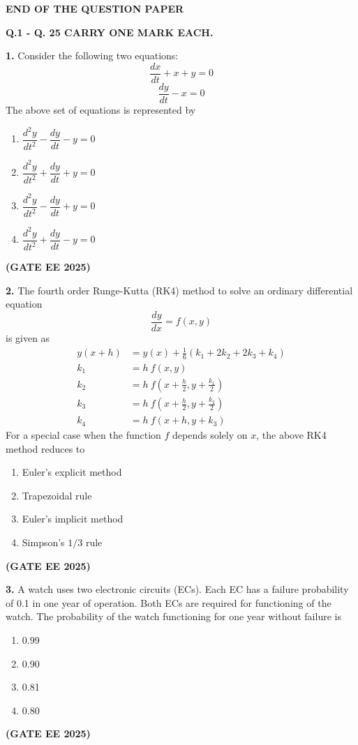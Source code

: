 \documentclass[journal,12pt,onecolumn]{IEEEtran}
\newcommand{\brak}[1]{(#1)}
\begin{document}
\begin{center}
\textbf{END OF THE QUESTION PAPER}
\end{center}
\newpage
\rmfamily 


\noindent\textbf{Q.1 - Q. 25 CARRY ONE MARK EACH.}


\noindent\textbf{1.} Consider the following two equations:
\[ \frac{dx}{dt}+x+y=0 \]
\[ \frac{dy}{dt}-x=0 \]
\normalsize The above set of equations is represented by
\begin{enumerate}
    \item $\dfrac{d^{2}y}{dt^{2}}-\dfrac{dy}{dt}-y=0$
    \item $\dfrac{d^{2}y}{dt^{2}}+\dfrac{dy}{dt}+y=0$
    \item $\dfrac{d^{2}y}{dt^{2}}-\dfrac{dy}{dt}+y=0$
    \item $\dfrac{d^{2}y}{dt^{2}}+\dfrac{dy}{dt}-y=0$
\end{enumerate}
\hfill \textbf{\brak{GATE EE 2025}}

\noindent\textbf{2.} The fourth order Runge-Kutta \brak{RK4} method to solve an ordinary differential equation
\[ \frac{dy}{dx}=f\brak{x,y} \]
is given as
\begin{align*}
y\brak{x+h}&=y\brak{x}+\frac{1}{6}\brak{k_{1}+2k_{2}+2k_{3}+k_{4}} \\
k_{1}&=h~f\brak{x,y} \\
k_{2}&=h~f\brak{x+\frac{h}{2},y+\frac{k_{1}}{2}} \\
k_{3}&=h~f\brak{x+\frac{h}{2},y+\frac{k_{2}}{2}} \\
k_{4}&=h~f\brak{x+h,y+k_{3}}
\end{align*}
For a special case when the function $f$ depends solely on $x$, the above RK4 method reduces to
\begin{enumerate}
    \item Euler's explicit method
    \item Trapezoidal rule
    \item Euler's implicit method
    \item Simpson's $1/3$ rule
\end{enumerate}
\hfill \textbf{\brak{GATE EE 2025}}


\noindent\textbf{3.} A watch uses two electronic circuits \brak{ECs}. Each EC has a failure probability of 0.1 in one year of operation. Both ECs are required for functioning of the watch. The probability of the watch functioning for one year without failure is
\begin{enumerate}
    \item 0.99
    \item 0.90
    \item 0.81
    \item 0.80
\end{enumerate}
\hfill \textbf{\brak{GATE EE 2025}}
\end{document}
